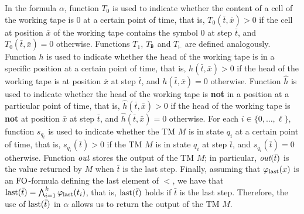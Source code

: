 In the formula $\alpha$, function $T_0$ is used to indicate whether the content of a cell of the working tape is 0 at a certain point of time, that is, $T_0(\bar{t},\bar{x}) > 0$ if the cell at position $\bar{x}$ of the working tape contains the symbol 0 at step $\bar{t}$, and $T_0(\bar{t},\bar{x}) = 0$ otherwise. Functions $T_1$, $T_{\mathtt{B}}$ and $T_{\vdash}$ are defined analogously. Function $h$ is used to indicate whether the head of the working tape is in a specific position at a certain point of time, that is, $h(\bar{t},\bar{x}) > 0$ if the head of the working tape is at position $\bar{x}$ at step $\bar{t}$, and $h(\bar{t},\bar{x}) = 0$ otherwise. 
Function $\hat{h}$ is used to indicate whether the head of the working tape is {\bf not} in a position at a particular point of time, that is, $\hat{h}(\bar{t},\bar{x}) > 0$ if the head of the working tape is {\bf not} at position $\bar{x}$ at step $\bar{t}$, and $\hat{h}(\bar{t},\bar{x}) = 0$ otherwise. For each $i \in \{0, \ldots, \ell\}$, function $s_{q_i}$ is used to indicate whether the TM $M$ is in state $q_i$ at a certain point of time, that is, $s_{q_i}(\bar{t}) > 0$ if the TM $M$ is in state $q_i$ at step $\bar{t}$, and $s_{q_i}(\bar{t}) = 0$ otherwise. Function $\text{\it out}$ stores the output of the TM $M$; in particular, $\text{\it out}(\bar t)$ is the value returned by $M$ when $\bar t$ is the last step. Finally, assuming that $\varphi_{\text{\rm last}}(x)$ is an ${\rm FO}$-formula defining the last element of $<$, we have that $\operatorname{last}(\bar t) = \bigwedge_{i=1}^k \varphi_{\text{\rm last}}(t_i)$, that is, $\operatorname{last}(\bar t)$ holds if $\bar t$ is the last step. Therefore, the use of $\operatorname{last}(\bar t)$ in $\alpha$ allows us to return the output of the TM $M$. 


